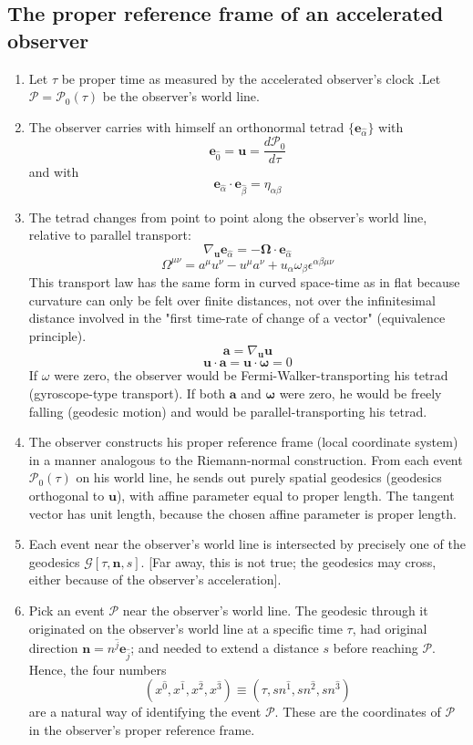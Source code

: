 \subsection{The proper reference frame of an accelerated observer}
\begin{enumerate}
\item Let $\tau$ be proper time as measured by the accelerated observer's clock .Let $\mathcal{P} = \mathcal{P}_0(\tau)$ be the observer's world line.
\item The observer carries with himself an orthonormal tetrad $\{\bm{e}_{\hat{\alpha}}\}$
with
\[\bm{e}_{\hat{0}} = \bm{u} = \frac{d \mathcal{P}_0}{d \tau}\]
and with
\[\bm{e}_{\hat{\alpha}} \cdot \bm{e}_{\hat{\beta}} = \eta_{\alpha \beta}\]
\item The tetrad changes from point to point along the observer's world line, relative to parallel transport:
\[\nabla_{\bm{u}} \bm{e}_{\hat{\alpha}} = - \bm{\Omega} \cdot \bm{e}_{\hat{\alpha}} \]
\[\Omega^{\mu \nu} = a^{\mu} u^{\nu} - u^{\mu} a^{\nu} + u_{\alpha} \omega_{\beta}\epsilon^{\alpha \beta \mu \nu}\]
This transport law has the same form in curved space-time as in flat because curvature can only be felt over finite distances, not over
the infinitesimal distance involved in the "first time-rate of change of a vector" (equivalence principle).
\[\bm{a} = \nabla_{\bm{u}} \bm{u}\]
\[\bm{u} \cdot \bm{a} = \bm{u} \cdot \bm{\omega} = 0\]
If $\omega$ were zero, the observer would be Fermi-Walker-transporting his tetrad (gyroscope-type transport). If both $\bm{a}$ and $\bm{\omega}$ were zero, he would be freely falling (geodesic motion) and would be parallel-transporting his tetrad.
\item The observer constructs his proper reference frame (local coordinate system) in a manner analogous to the Riemann-normal construction. From each event $\mathcal{P}_0(\tau)$ on his world line, he sends out purely spatial geodesics (geodesics orthogonal to $\bm{u}$), with affine parameter equal to proper length. The tangent vector has unit length, because the chosen affine
parameter is proper length.
\item Each event near the observer's world line is intersected by precisely one of the geodesics $\mathcal{G}[\tau,\bm{n},s]$. [Far away, this is not true; the geodesics may cross, either
because of the observer's acceleration].
\item Pick an event $\mathcal{P}$ near the observer's world line. The geodesic through it originated on the observer's world line at a specific time $\tau$, had original direction $\bm{n} = n^{\hat{j}} \bm{e}_{\hat{j}}$; and needed to extend a distance $s$ before reaching $\mathcal{P}$. Hence, the four numbers
\[(x^{\hat{0}},x^{\hat{1}},x^{\hat{2}},x^{\hat{3}}) \equiv (\tau,s n^{\hat{1}},s n^{\hat{2}},s n^{\hat{3}})\]
are a natural way of identifying the event $\mathcal{P}$. These are the coordinates of $\mathcal{P}$ in the observer's proper reference frame.
\end{enumerate}
